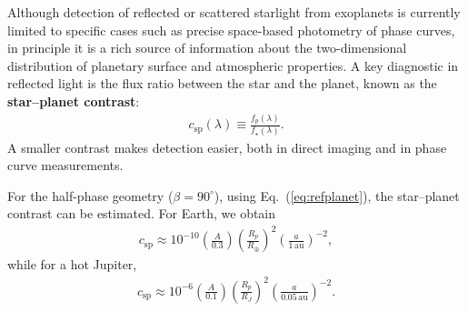 Although detection of reflected or scattered starlight from exoplanets is currently limited to specific cases such as precise space-based photometry of phase curves, in principle it is a rich source of information about the two-dimensional distribution of planetary surface and atmospheric properties. A key diagnostic in reflected light is the flux ratio between the star and the planet, known as the {\bf star–planet contrast}:
\begin{align}
\label{eq:contrast}
c_{\mathrm{sp}} (\lambda) \equiv \frac{f_p (\lambda)}{f_\star (\lambda)}.
\end{align}
A smaller contrast makes detection easier, both in direct imaging and in phase curve measurements.

For the half-phase geometry ($\beta = 90^\circ$), using Eq.~(\ref{eq:refplanet}), the star–planet contrast can be estimated. For Earth, we obtain
\begin{align}
\label{eq:refplanetearth}
c_\mathrm{sp}  \approx 10^{-10} \left( \frac{A}{0.3} \right) \left(\frac{R_p}{R_\oplus} \right)^{2} \left(\frac{a}{1 \, \mathrm{au}} \right)^{-2},
\end{align}
while for a hot Jupiter,
\begin{align}
\label{eq:refplanethj}
c_\mathrm{sp}  \approx 10^{-6} \left( \frac{A}{0.1} \right) \left(\frac{R_p}{R_J} \right)^{2} \left(\frac{a}{0.05 \, \mathrm{au}} \right)^{-2}.
\end{align}
